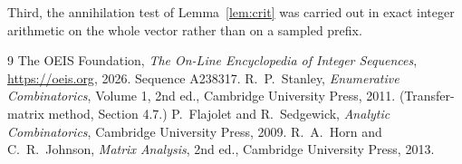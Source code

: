 \documentclass[11pt,a4paper]{article}
\theoremstyle{plain}
\theoremstyle{definition}
\begin{document}
Third, the annihilation test of Lemma~\ref{lem:crit} was carried out in exact integer
arithmetic on the whole vector rather than on a sampled prefix.

\begin{thebibliography}{9}
 The OEIS Foundation, \emph{The On-Line Encyclopedia of Integer
Sequences}, \url{https://oeis.org}, 2026. Sequence A238317.
 R.~P.~Stanley, \emph{Enumerative Combinatorics}, Volume 1, 2nd ed.,
Cambridge University Press, 2011. (Transfer-matrix method, Section 4.7.)
 P.~Flajolet and R.~Sedgewick, \emph{Analytic Combinatorics}, Cambridge
University Press, 2009.
 R.~A.~Horn and C.~R.~Johnson, \emph{Matrix Analysis}, 2nd ed., Cambridge
University Press, 2013.
\end{thebibliography}
\end{document}
